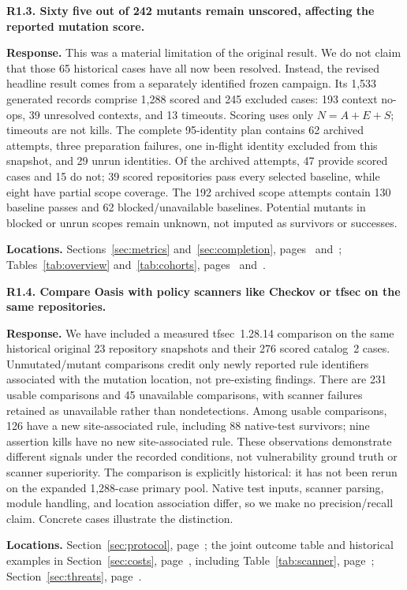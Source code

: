 \medskip
\noindent\textbf{R1.3. Sixty five out of 242 mutants remain unscored, affecting the reported mutation score.}\label{response:R1.3}\par
\textbf{Response.} This was a material limitation of the original result. We do not claim that those 65 historical cases have all now been resolved. Instead, the revised headline result comes from a separately identified frozen campaign. Its 1,533 generated records comprise 1,288 scored and 245 excluded cases: 193 context no-ops, 39 unresolved contexts, and 13 timeouts. Scoring uses only $N=A+E+S$; timeouts are not kills. The complete 95-identity plan contains 62 archived attempts, three preparation failures, one in-flight identity excluded from this snapshot, and 29 unrun identities. Of the archived attempts, 47 provide scored cases and 15 do not; 39 scored repositories pass every selected baseline, while eight have partial scope coverage. The 192 archived scope attempts contain 130 baseline passes and 62 blocked/unavailable baselines. Potential mutants in blocked or unrun scopes remain unknown, not imputed as survivors or successes.\par
\textbf{Locations.} Sections~\ref{sec:metrics} and~\ref{sec:completion}, pages~\pageref{sec:metrics} and~\pageref{sec:completion}; Tables~\ref{tab:overview} and~\ref{tab:cohorts}, pages~\pageref{tab:overview} and~\pageref{tab:cohorts}.

\medskip
\noindent\textbf{R1.4. Compare Oasis with policy scanners like Checkov or tfsec on the same repositories.}\label{response:R1.4}\par
\textbf{Response.} We have included a measured tfsec~1.28.14 comparison on the same historical original 23 repository snapshots and their 276 scored catalog~2 cases. Unmutated/mutant comparisons credit only newly reported rule identifiers associated with the mutation location, not pre-existing findings. There are 231 usable comparisons and 45 unavailable comparisons, with scanner failures retained as unavailable rather than nondetections. Among usable comparisons, 126 have a new site-associated rule, including 88 native-test survivors; nine assertion kills have no new site-associated rule. These observations demonstrate different signals under the recorded conditions, not vulnerability ground truth or scanner superiority. The comparison is explicitly historical: it has not been rerun on the expanded 1,288-case primary pool. Native test inputs, scanner parsing, module handling, and location association differ, so we make no precision/recall claim. Concrete cases illustrate the distinction.\par
\textbf{Locations.} Section~\ref{sec:protocol}, page~\pageref{sec:protocol}; the joint outcome table and historical examples in Section~\ref{sec:costs}, page~\pageref{sec:costs}, including Table~\ref{tab:scanner}, page~\pageref{tab:scanner}; Section~\ref{sec:threats}, page~\pageref{sec:threats}.

